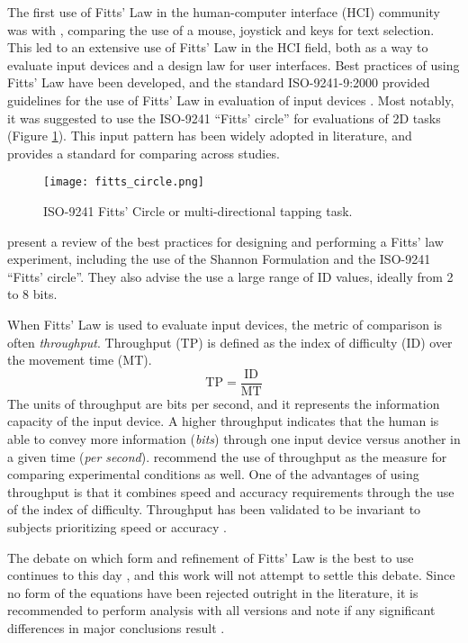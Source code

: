 The first use of Fitts' Law in the human-computer interface (HCI) community was with \citet{card_evaluation_1978}, comparing the use of a mouse, joystick and keys for text selection.
This led to an extensive use of Fitts' Law in the HCI field, both as a way to evaluate input devices and a design law for user interfaces.
Best practices of using Fitts' Law have been developed, and the standard ISO-9241-9:2000 provided guidelines for the use of Fitts' Law in evaluation of input devices \citep{international_organization_for_standardization_iso_2000}.
Most notably, it was suggested to use the ISO-9241 ``Fitts' circle'' for evaluations of 2D tasks (Figure \ref{fig:intro_fitts_circle}).
This input pattern has been widely adopted in literature, and provides a standard for comparing across studies.

\begin{figure}
    \centering
    \texttt{[image: fitts\_circle.png]}
    \caption{ISO-9241 Fitts' Circle or multi-directional tapping task.}
    \label{fig:intro_fitts_circle}
\end{figure}

\citet{soukoreff_towards_2004} present a review of the best practices for designing and performing a Fitts' law experiment, including the use of the Shannon Formulation and the ISO-9241 ``Fitts' circle''.
They also advise the use a large range of ID values, ideally from 2 to 8 bits.

When Fitts' Law is used to evaluate input devices, the metric of comparison is often \emph{throughput}.
Throughput (TP) is defined as the index of difficulty (ID) over the movement time (MT).
\begin{equation}
    \mathrm{TP} = \frac{\text{ID}}{\text{MT}}
\end{equation}
The units of throughput are bits per second, and it represents the information capacity of the input device.
A higher throughput indicates that the human is able to convey more information (\emph{bits}) through one input device versus another in a given time (\emph{per second}).
\citet{soukoreff_towards_2004} recommend the use of throughput as the measure for comparing experimental conditions as well.
One of the advantages of using throughput is that it combines speed and accuracy requirements through the use of the index of difficulty.
Throughput has been validated to be invariant to subjects prioritizing speed or accuracy \citep{mackenzie_fitts_2008}.

The debate on which form and refinement of Fitts' Law is the best to use continues to this day \citep{drewes_only_2010,hoffmann_which_2013}, and this work will not attempt to settle this debate.
Since no form of the equations have been rejected outright in the literature, it is recommended to perform analysis with all versions and note if any significant differences in major conclusions result \citep{soukoreff_towards_2004}.

